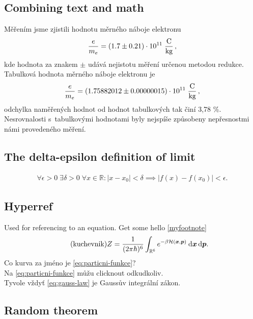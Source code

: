 \documentclass[11pt,a4paper]{report}
\theoremstyle{remark}
\theoremstyle{definition}
\begin{document}
		\subsection*{Combining text and math}
		
			Měřením jsme zjistili hodnotu měrného náboje elektronu
			\begin{equation*}
				\frac{e}{m_e} = (1.7 \pm 0.21) \cdot 10^{11} \; \frac{\text C}{\text{kg}} \, ,
			\end{equation*}
				kde hodnota za znakem $\pm$ udává nejistotu měření určenou metodou redukce. \\
				Tabulková hodnota měrného náboje elektronu je
			\begin{equation*}
				\frac{e}{m_e} = (1.75882012 \pm 0.00000015) \cdot 10^{11} \; \frac{\text C}{\text{kg}} \, ,
			\end{equation*}
				odchylka naměřených hodnot od hodnot tabulkových tak činí 3,78 \%. Nesrovnalosti s tabulkovými hodnotami byly nejspíše způsobeny nepřesnostmi námi provedeného měření.
			
		\subsection*{The delta-epsilon definition of limit}
		
			\begin{align*}
				\forall \epsilon > 0\; \exists \delta > 0\; \forall x \in \mathbb R : |x - x_0| < \delta \implies |f(x) - f(x_0)| < \epsilon.
			\end{align*}
		
		\subsection*{Hyperref}
		
			Used for referencing to an equation. Get some hello \ref{myfootnote}
			\begin{align*}
				\label{eq:particni-funkce}
				\tag{kuchevnik}
				Z = \frac{1}{(2\pi \hbar)^6}\int_{\mathbb R^6} e^{-\beta \mathcal H(\boldsymbol x, \boldsymbol p)} \: {\mathrm d} \boldsymbol x \, {\mathrm d} \boldsymbol p.
			\end{align*}
			Co kurva za jméno je \eqref{eq:particni-funkce}? \\
			Na \eqref{eq:particni-funkce} můžu clicknout odkudkoliv. \\
			Tyvole vždyť \eqref{eq:gauss-law} je Gaussův integrální zákon.
		
		\subsection*{Random theorem}
			
\end{document}
